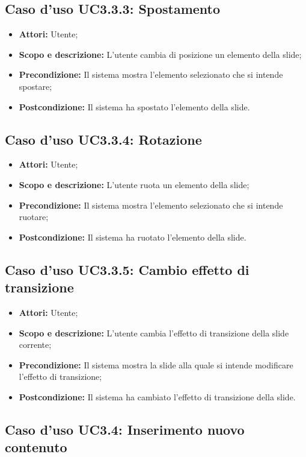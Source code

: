 \subsection{Caso d'uso UC3.3.3: Spostamento}
\begin{itemize}
	\item \textbf{Attori:} Utente;
	\item \textbf{Scopo e descrizione:} L'utente cambia di posizione un elemento della slide;
	\item \textbf{Precondizione:} Il sistema mostra l'elemento selezionato che si intende spostare;
	\item \textbf{Postcondizione:} Il sistema ha spostato l'elemento della slide.
\end{itemize}

\subsection{Caso d'uso UC3.3.4: Rotazione}
\begin{itemize}
	\item \textbf{Attori:} Utente;
	\item \textbf{Scopo e descrizione:} L'utente ruota un elemento della slide;
	\item \textbf{Precondizione:} Il sistema mostra l'elemento selezionato che si intende ruotare;
	\item \textbf{Postcondizione:} Il sistema ha ruotato l'elemento della slide.
\end{itemize}

\subsection{Caso d'uso UC3.3.5: Cambio effetto di transizione}
\begin{itemize}
	\item \textbf{Attori:} Utente;
	\item \textbf{Scopo e descrizione:} L'utente cambia l'effetto di transizione della slide corrente;
	\item \textbf{Precondizione:} Il sistema mostra la slide alla quale si intende modificare l'effetto di transizione;
	\item \textbf{Postcondizione:} Il sistema ha cambiato l'effetto di transizione della slide.
\end{itemize}
\newpage

\subsection{Caso d'uso UC3.4: Inserimento nuovo contenuto}

